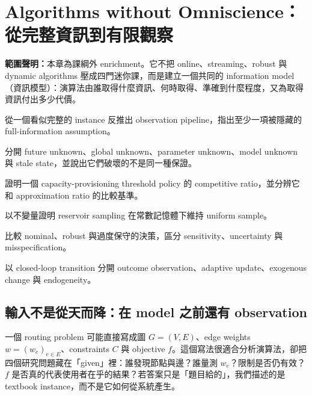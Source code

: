 \documentclass[11pt,a4paper,oneside,openany]{book}
\begin{document}
\chapter{Algorithms without Omniscience：從完整資訊到有限觀察}
\label{app:without-omniscience}
\noindent\textbf{範圍聲明：}本章為課綱外 enrichment。它不把 online、streaming、robust 與 dynamic algorithms 壓成四門迷你課，而是建立一個共同的 information model（資訊模型）：演算法由誰取得什麼資訊、何時取得、準確到什麼程度，又為取得資訊付出多少代價。
\begin{chaptermastery}
\item 從一個看似完整的 instance 反推出 observation pipeline，指出至少一項被隱藏的 full-information assumption。
\item 分開 future unknown、global unknown、parameter unknown、model unknown 與 stale state，並說出它們破壞的不是同一種保證。
\item 證明一個 capacity-provisioning threshold policy 的 competitive ratio，並分辨它和 approximation ratio 的比較基準。
\item 以不變量證明 reservoir sampling 在常數記憶體下維持 uniform sample。
\item 比較 nominal、robust 與過度保守的決策，區分 sensitivity、uncertainty 與 misspecification。
\item 以 closed-loop transition 分開 outcome observation、adaptive update、exogenous change 與 endogeneity。
\end{chaptermastery}

\section{輸入不是從天而降：在 model 之前還有 observation}

一個 routing problem 可能直接寫成圖 $G=(V,E)$、edge weights $w=(w_e)_{e\in E}$、constraints $C$ 與 objective $f$。這個寫法很適合分析演算法，卻把四個研究問題藏在「given」裡：誰發現節點與邊？誰量測 $w_e$？限制是否仍有效？$f$ 是否真的代表使用者在乎的結果？若答案只是「題目給的」，我們描述的是 textbook instance，而不是它如何從系統產生。
\end{document}
